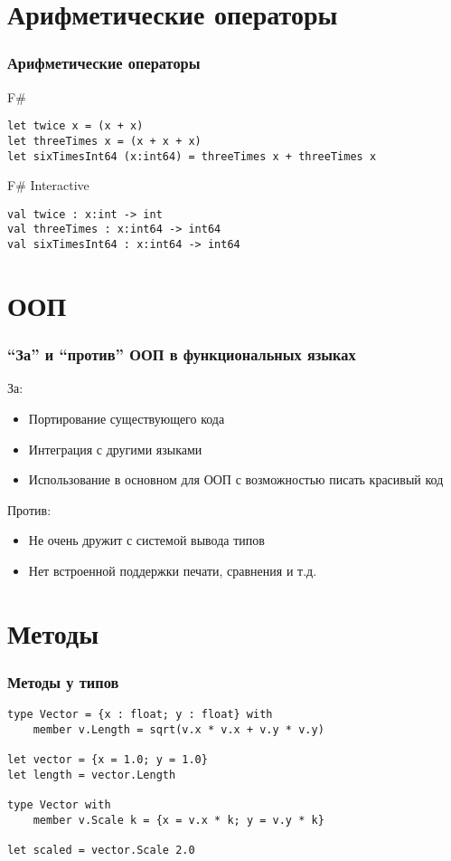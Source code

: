 \documentclass[xetex,mathserif,serif]{beamer}
\begin{document}
	\section{Арифметические операторы}

	\begin{frame}[fragile]
		\frametitle{Арифметические операторы}
		\begin{exampleblock}{F\#}
			\begin{verbatim}
let twice x = (x + x)
let threeTimes x = (x + x + x)
let sixTimesInt64 (x:int64) = threeTimes x + threeTimes x
			\end{verbatim}
		\end{exampleblock}

		\begin{alertblock}{F\# Interactive}
			\begin{verbatim}
val twice : x:int -> int
val threeTimes : x:int64 -> int64
val sixTimesInt64 : x:int64 -> int64
			\end{verbatim}
		\end{alertblock}
\end{frame}

	\section{ООП}

	\begin{frame}
		\frametitle{``За'' и ``против'' ООП в функциональных языках}
		За:
		\begin{itemize}
			\item Портирование существующего кода
			\item Интеграция с другими языками
			\item Использование в основном для ООП с возможностью писать красивый код
		\end{itemize}
		
		Против:
		\begin{itemize}
			\item Не очень дружит с системой вывода типов
			\item Нет встроенной поддержки печати, сравнения и т.д.
		\end{itemize}
	\end{frame}

	\section{Методы}

	\begin{frame}[fragile]
		\frametitle{Методы у типов}
		\begin{verbatim}
type Vector = {x : float; y : float} with
    member v.Length = sqrt(v.x * v.x + v.y * v.y)

let vector = {x = 1.0; y = 1.0}
let length = vector.Length

type Vector with
    member v.Scale k = {x = v.x * k; y = v.y * k}

let scaled = vector.Scale 2.0
		\end{verbatim}
\end{frame}
\end{document}
